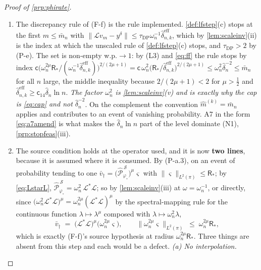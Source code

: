 \begin{proof}[Proof of \cref{prp:phirate}]
\begin{enumerate}
\item[(L4)] The discrepancy rule of \textup{(F-f)} is the rule implemented.
\cref{def:lfstep}(c) stops at the first $m\le\bar m_n$ with
$\|\mathcal Lv_m-y^\delta\|\le\tau_{\mathrm{DP}}\omega_n^{-1}\hat\delta^{\mathrm{eff}}_{n,k}$,
which by \cref{lem:scaleinv}(ii) is the index at which the unscaled rule of \cref{def:lfstep}(c) stops,
and $\tau_{\mathrm{DP}}>2$ by (P-e). The set is non-empty w.p.$\to1$: by (L3) and \eqref{eq:ff} the rule
stops by index
$\mathsf c\big(\omega_n^{2\mu}\mathsf R_\ast\big/(\omega_n^{-1}\hat\delta^{\mathrm{eff}}_{n,k})\big)^{2/(2\mu+1)}
=\mathsf c\,\omega_n^{2}\big(\mathsf R_\ast/\hat\delta^{\mathrm{eff}}_{n,k}\big)^{2/(2\mu+1)}
\le\omega_n^{2}\hat\delta_n^{-2}\le\bar m_n$
for all $n$ large, the middle inequality because $2/(2\mu+1)<2$ for $\mu>\tfrac12$ and
$\hat\delta^{\mathrm{eff}}_{n,k}\ge\mathsf c_{14}\hat\delta_n\ln n$. \emph{The factor $\omega_n^{2}$
is \cref{lem:scaleinv}(v) and is exactly why the cap is \eqref{eq:cap} and not $\hat\delta_n^{-2}$}.
On the complement the convention $\hat m^{(k)}=\bar m_n$ applies and contributes to an event of
vanishing probability. A7 in the form \eqref{eq:a7amend} is what makes the $\hat\delta_n\ln n$ part of
the level dominate (N1), \cref{prp:stopfeas}(iii).
\item[(L5)] The source condition holds at the operator used, and it is now \textbf{two lines},
because it is assumed where it is consumed. By (P-a.3), on an event of probability tending to one
$\bar v_\dagger=\big(\hat{\mathcal P}^{\,\mathcal S}_{\varphi_\circ}\big)^{\mu}\varsigma$ with
$\|\varsigma\|_{L^{2}(\pi)}\le\mathsf R_\ast$; by \eqref{eq:LstarL},
$\hat{\mathcal P}^{\,\mathcal S}_{\varphi_\circ}=\omega_n^{2}\,\mathcal L^{\ast}\mathcal L$; so by
\cref{lem:scaleinv}(iii) at $\omega=\omega_n^{-1}$, or directly, since
$\big(\omega_n^{2}\mathcal L^{\ast}\mathcal L\big)^{\mu}=\omega_n^{2\mu}(\mathcal L^{\ast}\mathcal L)^{\mu}$
by the spectral-mapping rule for the continuous function $\lambda\mapsto\lambda^{\mu}$ composed with
$\lambda\mapsto\omega_n^{2}\lambda$, 
\[
\bar v_\dagger\;=\;\big(\mathcal L^{\ast}\mathcal L\big)^{\mu}\big(\omega_n^{2\mu}\varsigma\big),
\qquad
\big\|\omega_n^{2\mu}\varsigma\big\|_{L^{2}(\pi)}\;\le\;\omega_n^{2\mu}\mathsf R_\ast ,
\]
which is exactly (F-f)'s source hypothesis at radius $\omega_n^{2\mu}\mathsf R_\ast$.
Three things are absent from this step and each would be a defect. \emph{(a) No interpolation.}

\end{enumerate}
\end{proof}
